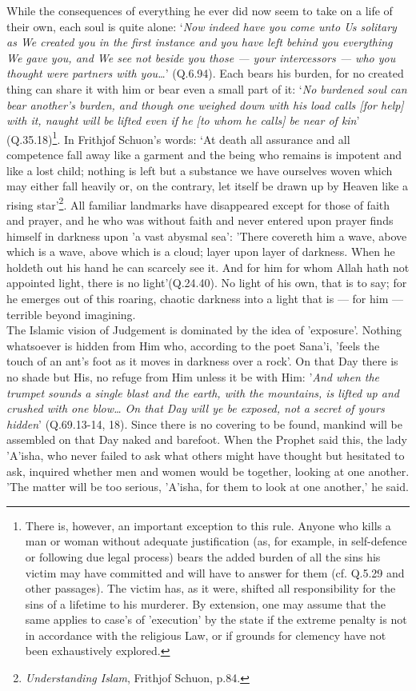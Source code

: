 \documentclass[10pt, twoside]{book}
\begin{document}
While the consequences of everything he ever did now seem to take on a life of their own, each soul 
is quite alone: `\emph{Now indeed have you come unto Us solitary as We created you in the first instance 
and you have left behind you everything We gave you, and We see not beside you those --- your 
intercessors --- who you thought were partners with you\ldots{}}' (Q.6.94). Each bears his burden, for no 
created thing can share it with him or bear even a small part of it: `\emph{No burdened soul can bear 
another's burden, and though one weighed down with his load calls [for help] with it, naught will be 
lifted even if he [to whom he calls] be near of kin}' (Q.35.18)\footnote{There is, however, an important exception to this rule. Anyone who kills a man or woman without 
adequate justification (as, for example, in self\hyp{}defence or following due legal process) bears the 
added burden of all the sins his victim may have committed and will have to answer for them (cf. 
Q.5.29 and other passages). The victim has, as it were, shifted all responsibility for the sins of a 
lifetime to his murderer. By extension, one may assume that the same applies to case's of 'execution' 
by the state if the extreme penalty is not in accordance with the religious Law, or if grounds for 
clemency have not been exhaustively explored.}. In Frithjof Schuon's words: `At 
death all assurance and all competence fall away like a garment and the being who remains is impotent 
and like a lost child; nothing is left but a substance we have ourselves woven which may either fall 
heavily or, on the contrary, let itself be drawn up by Heaven like a rising star'\footnote{\emph{Understanding Islam}, Frithjof Schuon, p.84.}. All familiar 
landmarks have disappeared except for those of faith and prayer, and he who was without faith and 
never entered upon prayer finds himself in darkness upon 'a vast abysmal sea': 'There covereth him a 
wave, above which is a wave, above which is a cloud; layer upon layer of darkness. When he holdeth 
out his hand he can scarcely see it. And for him for whom Allah hath not appointed light, there is no 
light'(Q.24.40). No light of his own, that is to say; for he emerges out of this roaring, chaotic 
darkness into a light that is --- for him --- terrible beyond imagining. \\

The Islamic vision of Judgement is dominated by the idea of 'exposure'. Nothing whatsoever is hidden 
from Him who, according to the poet Sana'i, 'feels the touch of an ant's foot as it moves in darkness 
over a rock'. On that Day there is no shade but His, no refuge from Him unless it be with Him: '\emph{And 
when the trumpet sounds a single blast and the earth, with the mountains, is lifted up and crushed 
with one blow\ldots{} On that Day will ye be exposed, not a secret of yours hidden}' (Q.69.13\hyp{}14, 18). 
Since there is no covering to be found, mankind will be assembled on that Day naked and barefoot. 
When the Prophet said this, the lady 'A'isha, who never failed to ask what others might have thought 
but hesitated to ask, inquired whether men and women would be together, looking at one another. 'The 
matter will be too serious, 'A'isha, for them to look at one another,' he said. \\
\end{document}
